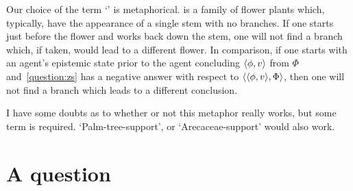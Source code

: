 \begin{note}
  Our choice of the term `' is metaphorical.
   is a family of flower plants which, typically, have the appearance of a single stem with no branches.
  If one starts just before the flower and works back down the stem, one will not find a branch which, if taken, would lead to a different flower.
  In comparison, if one starts with an agent's epistemic state prior to the agent concluding \(\langle \phi, v \rangle\) from \(\Phi\) and~\autoref{question:zs} has a negative answer with respect to \(\langle \langle \phi, v \rangle, \Phi \rangle\), then one will not find a branch which leads to a different conclusion.

  I have some doubts as to whether or not this metaphor really works, but some term is required.
  `Palm-tree-support', or `Arecaceae-support' would also work.
\end{note}

\section{A question}
\label{cha:zS:sec:question}

